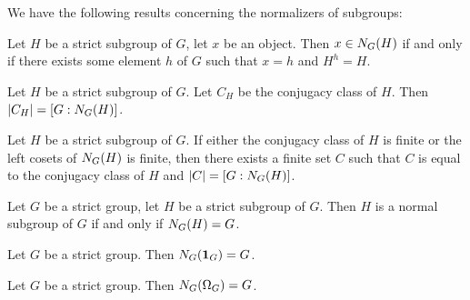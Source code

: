 \documentclass{article}
\begin{document}
We have the following results concerning the normalizers of subgroups:
\begin{thm}
\item\label{group3:134} Let $H$ be a strict subgroup of $G$, let $x$ be
  an object. Then $x\in N_{G}(H)$ if and only if there exists
  some element $h$ of $G$ such that $x=h$ and $H^{h}=H$.
\item\label{group3:135} Let $H$ be a strict subgroup of $G$.
  Let $C_{H}$ be the conjugacy class of $H$.
  Then $|C_{H}|=[G : N_{G}(H)]$.
\item\label{group3:136} Let $H$ be a strict subgroup of $G$.
  If either the conjugacy class of $H$ is finite or the left cosets of
  $N_{G}(H)$ is finite, then there exists a finite set $C$ such
  that $C$ is equal to the conjugacy class of $H$ and $|C|=[G : N_{G}(H)]$.
\item\label{group3:137} Let $G$ be a strict group, let $H$ be a strict
  subgroup of $G$. Then $H$ is a normal subgroup of $G$ if and only if $N_{G}(H)=G$.
\item\label{group3:138} Let $G$ be a strict group. Then $N_{G}(\mathbf{1}_{G})=G$.
\item\label{group3:139} Let $G$ be a strict group. Then $N_{G}(\Omega_{G})=G$.
\end{thm}
\end{document}
